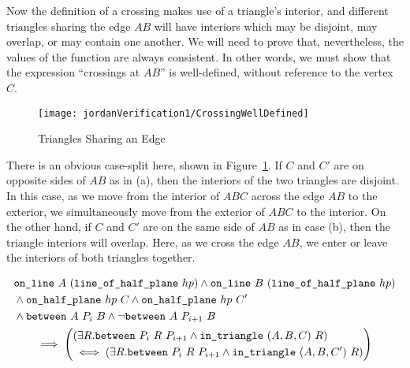Now the definition of a crossing makes use of a triangle's interior, and different triangles sharing the edge $AB$ will have interiors which may be disjoint, may overlap, or may contain one another. We will need to prove that, nevertheless, the values of the function  are always consistent. In other words, we must show that the expression ``crossings at $AB$'' is well-defined, without reference to the vertex $C$.

\begin{figure}
\centering\texttt{[image: jordanVerification1/CrossingWellDefined]}
\caption{Triangles Sharing an Edge}
\label{fig:CrossingWellDefined}
\end{figure}

There is an obvious case-split here, shown in Figure~\ref{fig:CrossingWellDefined}. If $C$ and $C'$ are on opposite sides of $AB$ as in (a), then the interiors of the two triangles are disjoint. In this case, as we move from the interior of $ABC$ across the edge $AB$ to the exterior, we simultaneously move from the exterior of $ABC$ to the interior. On the other hand, if $C$ and $C'$ are on the same side of $AB$ as in case (b), then the triangle interiors will overlap. Here, as we cross the edge $AB$, we enter or leave the interiors of both triangles together. 

\begin{multline}\label{eq:crossChangeLemma1}
  \begin{aligned}
    &\texttt{on\_line}\ A\ (\texttt{line\_of\_half\_plane}\ hp) \wedge \texttt{on\_line}\ B\ (\texttt{line\_of\_half\_plane}\ hp)\\
    &\wedge\texttt{on\_half\_plane}\ hp\ C \wedge \texttt{on\_half\_plane}\ hp\ C'\\
    &\wedge\texttt{between}\ A\ P_i\ B \wedge \neg\texttt{between}\ A\ P_{i+1}\ B
  \end{aligned}\\
  \implies\left(\begin{aligned} 
      &(\exists R. \texttt{between}\ P_i\ R\ P_{i+1} \wedge \texttt{in\_triangle}\ (A,B,C)\ R)\\
      & \iff (\exists R. \texttt{between}\ P_i\ R\ P_{i+1} \wedge \texttt{in\_triangle}\ (A,B,C')\ R)
  \end{aligned}\right)
\end{multline}

